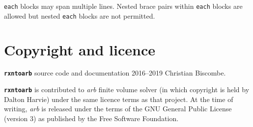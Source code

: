 \documentclass[fontsize=12pt,
               captions=abovetable,
               numbers=noenddot,
              ]{scrartcl}
\DeclareRobustCommand{\lmr}[2][T1]{{\fontencoding{#1}\fontfamily{lmr}\selectfont#2}}
\renewcommand{\copyright}{\lmr[TS1]{\textcopyright}}
\newcommand{\eg}[1][\ ]{e.g.#1}
\newcommand{\rxntoarb}{\texttt{\textbf{rxntoarb}}}
\newcommand{\syntax}[2]{\textcolor{#1}{\texttt{#2}}}
\begin{document}
\syntax{template}{each} blocks may span multiple lines. Nested brace pairs within \syntax{template}{each} blocks are allowed but nested \syntax{template}{each} blocks are not permitted.


%
%
\section{Copyright and licence}

\rxntoarb{} source code and documentation \copyright{} 2016--2019 Christian Biscombe.

\rxntoarb{} is contributed to \emph{arb} finite volume solver (in which copyright is held by Dalton Harvie) under the same licence terms as that project. At the time of writing, \emph{arb} is released under the terms of the GNU General
Public License (version 3) as published by the Free Software Foundation.

\end{document}
